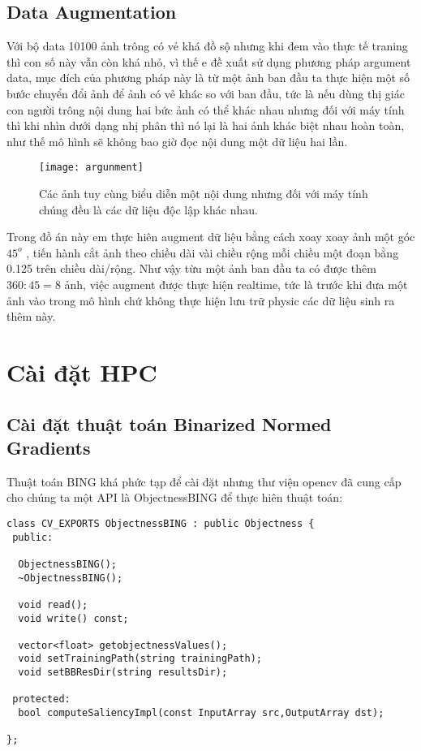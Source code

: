 \documentclass[13pt, a4paper]{extreport}
\begin{document}
\subsection{Data Augmentation}
\indent Với bộ data 10100 ảnh trông có vẻ khá đồ sộ nhưng  khi đem vào thực tế traning thì con số này vẫn còn khá nhỏ, vì thế e đề xuất sử dụng phương pháp argument data, mục đích của phương pháp này là từ một ảnh ban đầu ta thực hiện một số bước chuyển đổi ảnh để ảnh có vẻ khác so với ban đầu, tức là nếu dùng thị giác con người trông nội dung hai bức ảnh có thể khác nhau nhưng đối với máy tính thì khi nhìn dưới dạng nhị phân thì nó lại là hai ảnh khác biệt nhau hoàn toàn, như thế mô hình sẽ không bao giờ đọc nội dung một dữ liệu hai lần. \\
\begin{figure}[H]
  \centering
  \captionsetup{justification=centering,margin=2cm}
    \texttt{[image: argunment]}
   \caption{\large Các ảnh tuy cùng biểu diễn một nội dung  \newline nhưng đối với máy tính chúng đều là các dữ liệu độc lập khác nhau.}
\end{figure}
\indent Trong đồ án này em thực hiên augment dữ liệu bằng cách xoay xoay ảnh một góc $45^o$ , tiến hành cắt ảnh theo chiều dài vài chiều rộng mỗi chiều một đoạn bằng 0.125 trên chiều dài/rộng. Như vậy từu một ảnh ban đầu ta có được thêm $360 : 45 = 8$ ảnh, việc augment được thực hiện realtime, tức là trước khi đưa một ảnh vào trong mô hình chứ không thực hiện lưu trữ physic các dữ liệu sinh ra thêm này.
 
\section{Cài đặt HPC}
\subsection{Cài đặt thuật toán Binarized Normed Gradients}
\indent Thuật toán BING khá phức tạp để cài đặt nhưng thư viện opencv đã cung cấp cho chúng ta một API là ObjectnessBING để thực hiên thuật toán:
\begin{lstlisting}
class CV_EXPORTS ObjectnessBING : public Objectness {
 public:

  ObjectnessBING();
  ~ObjectnessBING();

  void read();
  void write() const;

  vector<float> getobjectnessValues();
  void setTrainingPath(string trainingPath);
  void setBBResDir(string resultsDir);

 protected:
  bool computeSaliencyImpl(const InputArray src,OutputArray dst);

};
\end{lstlisting}
\end{document}
